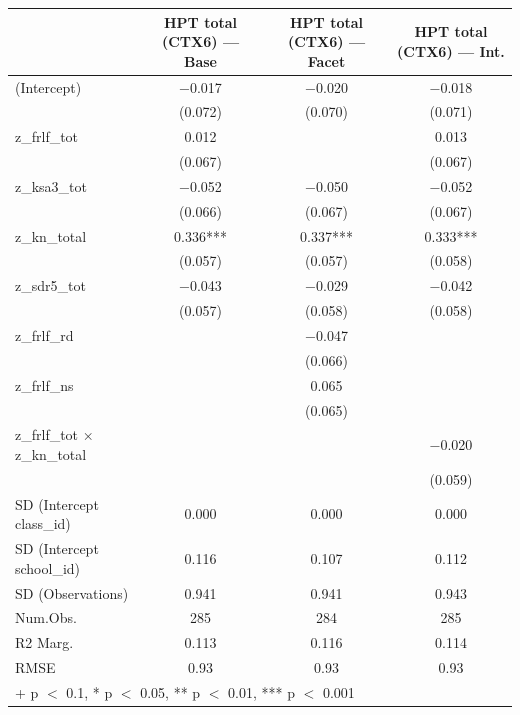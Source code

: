 \documentclass[
  10pt,
]{article}
\begin{document}
\begin{table}
\centering
\begin{tabular}[t]{lccc}
\toprule
  & HPT total (CTX6) — Base & HPT total (CTX6) — Facet & HPT total (CTX6) — Int.\\
\midrule
(Intercept) & \num{-0.017} & \num{-0.020} & \num{-0.018}\\
 & (\num{0.072}) & (\num{0.070}) & (\num{0.071})\\
z\_frlf\_tot & \num{0.012} &  & \num{0.013}\\
 & (\num{0.067}) &  & (\num{0.067})\\
z\_ksa3\_tot & \num{-0.052} & \num{-0.050} & \num{-0.052}\\
 & (\num{0.066}) & (\num{0.067}) & (\num{0.067})\\
z\_kn\_total & \num{0.336}*** & \num{0.337}*** & \num{0.333}***\\
 & (\num{0.057}) & (\num{0.057}) & (\num{0.058})\\
z\_sdr5\_tot & \num{-0.043} & \num{-0.029} & \num{-0.042}\\
 & (\num{0.057}) & (\num{0.058}) & (\num{0.058})\\
z\_frlf\_rd &  & \num{-0.047} & \\
 &  & (\num{0.066}) & \\
z\_frlf\_ns &  & \num{0.065} & \\
 &  & (\num{0.065}) & \\
z\_frlf\_tot × z\_kn\_total &  &  & \num{-0.020}\\
 &  &  & (\num{0.059})\\
SD (Intercept class\_id) & \num{0.000} & \num{0.000} & \num{0.000}\\
SD (Intercept school\_id) & \num{0.116} & \num{0.107} & \num{0.112}\\
SD (Observations) & \num{0.941} & \num{0.941} & \num{0.943}\\
\midrule
Num.Obs. & \num{285} & \num{284} & \num{285}\\
R2 Marg. & \num{0.113} & \num{0.116} & \num{0.114}\\
RMSE & \num{0.93} & \num{0.93} & \num{0.93}\\
\bottomrule
\multicolumn{4}{l}{\rule{0pt}{1em}+ p $<$ 0.1, * p $<$ 0.05, ** p $<$ 0.01, *** p $<$ 0.001}\\
\end{tabular}
\end{table}
\end{document}
